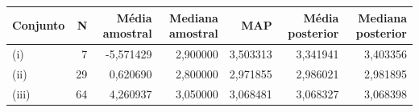 \begin{tabular}{lrrrrrr}
\toprule
Conjunto & N & Média amostral & Mediana amostral & MAP & Média posterior & Mediana posterior \\
\midrule
(i) & 7 & -5,571429 & 2,900000 & 3,503313 & 3,341941 & 3,403356 \\
(ii) & 29 & 0,620690 & 2,800000 & 2,971855 & 2,986021 & 2,981895 \\
(iii) & 64 & 4,260937 & 3,050000 & 3,068481 & 3,068327 & 3,068398 \\
\bottomrule
\end{tabular}
